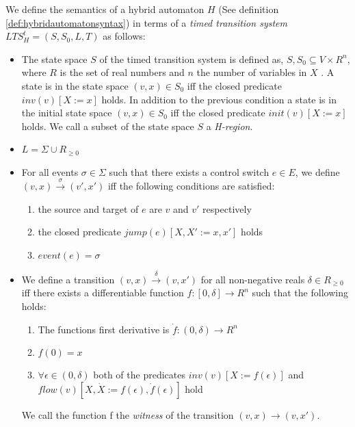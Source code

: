 \medskip
\begin{mydef}
We define the semantics of a hybrid automaton $H$ (See definition \ref{def:hybridautomatonsyntax}) in terms of a \emph{timed transition system} $LTS^t_H = (S,S_0,L,T)$ as follows:


\begin{itemize}
 
\item The state space $S$ of the timed transition system is defined as, $S, S_0 \subseteq V \times R^n$, where $R$ is the set of real numbers and $n$ the number of variables in $X$ . A state is in the state space $(v,x) \in S_0$ iff the closed predicate $inv(v)[X := x]$ holds. In addition to the previous condition a state is in the initial state space $(v,x) \in S_0$ iff the closed predicate $init(v)[X := x]$ holds. We call a subset of the state space $S$ a \emph{H-region}.


\item $L = \Sigma \cup R_{\geq 0}$

\item For all events $\sigma \in \Sigma$ such that there exists a control switch $e \in E$, we define $(v,x) \xrightarrow{\sigma} (v',x')$ iff the following conditions are satisfied:
\begin{enumerate}
\item the source and target of $e$ are $v$ and $v'$ respectively
\item the closed predicate $jump(e)[X, X' := x,x']$ holds
\item $event(e) = \sigma$
\end{enumerate}

\item We define a transition $(v,x) \xrightarrow{\delta} (v,x')$ for all non-negative reals $\delta \in R_{\geq 0}$ iff there exists a differentiable function $f: [0, \delta] \to R^n$ such that the following holds:
\begin{enumerate}
\item The functions first derivative is $\dot{f} :(0,\delta) \to R^n$
\item $f(0) = x$
\item $\forall \epsilon \in (0,\delta)$ both of the predicates $inv(v)[X := f(\epsilon)]$ and $flow(v)[X,\dot{X} := f(\epsilon),\dot{f}(\epsilon)]$ hold
\end{enumerate}
We call the function f the \emph{witness} of the transition $(v,x) \to (v, x')$.

\end{itemize}


\end{mydef}
